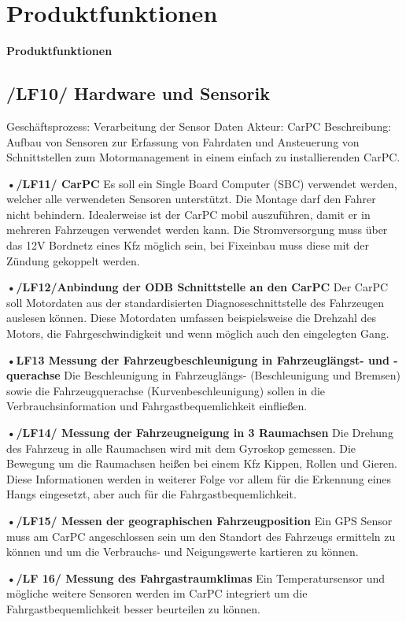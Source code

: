 \chapter{Produktfunktionen}

\textbf{Produktfunktionen}
\section{/LF10/ Hardware und Sensorik}
Geschäftsprozess:	Verarbeitung der Sensor Daten
Akteur:			CarPC
Beschreibung:	Aufbau von Sensoren zur Erfassung von Fahrdaten und Ansteuerung von Schnittstellen zum Motormanagement in einem einfach zu installierenden CarPC.

\textbf{•/LF11/ CarPC}
Es soll ein Single Board Computer (SBC) verwendet werden, welcher alle verwendeten Sensoren unterstützt. Die Montage darf den Fahrer nicht behindern. Idealerweise ist der CarPC mobil auszuführen, damit er in mehreren Fahrzeugen verwendet werden kann. Die Stromversorgung muss über das 12V Bordnetz eines Kfz möglich sein, bei Fixeinbau muss diese mit der Zündung gekoppelt werden.

\textbf{•/LF12/Anbindung der ODB Schnittstelle an den CarPC}
Der CarPC soll Motordaten aus der standardisierten Diagnoseschnittstelle des Fahrzeugen auslesen können. Diese Motordaten umfassen beispielsweise die Drehzahl des Motors, die Fahrgeschwindigkeit und wenn möglich auch den eingelegten Gang.

\textbf{•LF13 Messung der Fahrzeugbeschleunigung in Fahrzeuglängst- und -querachse}
Die Beschleunigung in Fahrzeuglängs- (Beschleunigung und Bremsen) sowie die Fahrzeugquerachse (Kurvenbeschleunigung) sollen in die Verbrauchsinformation und Fahrgastbequemlichkeit einfließen.

\textbf{•/LF14/ Messung der Fahrzeugneigung in 3 Raumachsen}
Die Drehung des Fahrzeug in alle Raumachsen wird mit dem Gyroskop gemessen. Die Bewegung um die Raumachsen heißen bei einem Kfz Kippen, Rollen und Gieren. Diese Informationen werden in weiterer Folge vor allem für die Erkennung eines Hangs eingesetzt, aber auch für die Fahrgastbequemlichkeit.

\textbf{•/LF15/ Messen der geographischen Fahrzeugposition}
Ein GPS Sensor muss am CarPC angeschlossen sein um den Standort des Fahrzeugs ermitteln zu können und um die Verbrauchs- und Neigungswerte kartieren zu können.

\textbf{•/LF 16/ Messung des Fahrgastraumklimas}
Ein Temperatursensor und mögliche weitere Sensoren werden im CarPC integriert um die Fahrgastbequemlichkeit besser beurteilen zu können.

